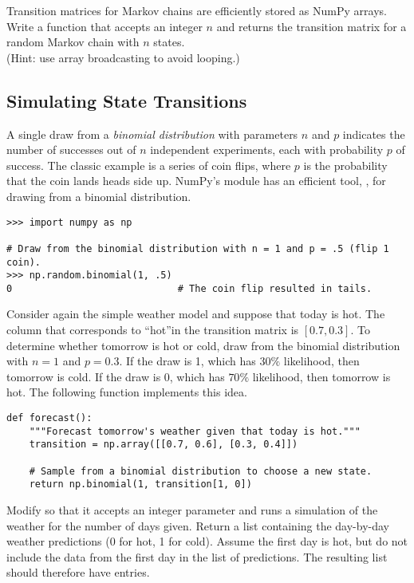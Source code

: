 %
\begin{problem} %
Transition matrices for Markov chains are efficiently stored as NumPy arrays.
Write a function that accepts an integer $n$ and returns the transition matrix for a random Markov chain with $n$ states.
\\ (Hint: use array broadcasting to avoid looping.)
\label{prob:random-markov-chain}
\end{problem}

\subsection*{Simulating State Transitions} %

A single draw from a \emph{binomial distribution} with parameters $n$ and $p$ indicates the number of successes out of $n$ independent experiments, each with probability $p$ of success.
The classic example is a series of coin flips, where $p$ is the probability that the coin lands heads side up.
NumPy's  module has an efficient tool, , for drawing from a binomial distribution.

\begin{lstlisting}
>>> import numpy as np

# Draw from the binomial distribution with n = 1 and p = .5 (flip 1 coin).
>>> np.random.binomial(1, .5)
0                             # The coin flip resulted in tails.
\end{lstlisting}

Consider again the simple weather model and suppose that today is hot.
The column that corresponds to ``hot''in the transition matrix is $[0.7, 0.3]$.
To determine whether tomorrow is hot or cold, draw from the binomial distribution with $n = 1$ and $p = 0.3$.
If the draw is 1, which has $30\%$ likelihood, then tomorrow is cold.
If the draw is 0, which has $70\%$ likelihood, then tomorrow is hot.
The following function implements this idea.

\begin{lstlisting}
def forecast():
    """Forecast tomorrow's weather given that today is hot."""
    transition = np.array([[0.7, 0.6], [0.3, 0.4]])

    # Sample from a binomial distribution to choose a new state.
    return np.binomial(1, transition[1, 0])
\end{lstlisting}

\begin{problem} %
Modify  so that it accepts an integer parameter  and runs a simulation of the weather for the number of days given.
Return a list containing the day-by-day weather predictions (0 for hot, 1 for cold).
Assume the first day is hot, but do not include the data from the first day in the list of predictions.
The resulting list should therefore have  entries.
\label{prob:small-markov-transitions}
\end{problem}

